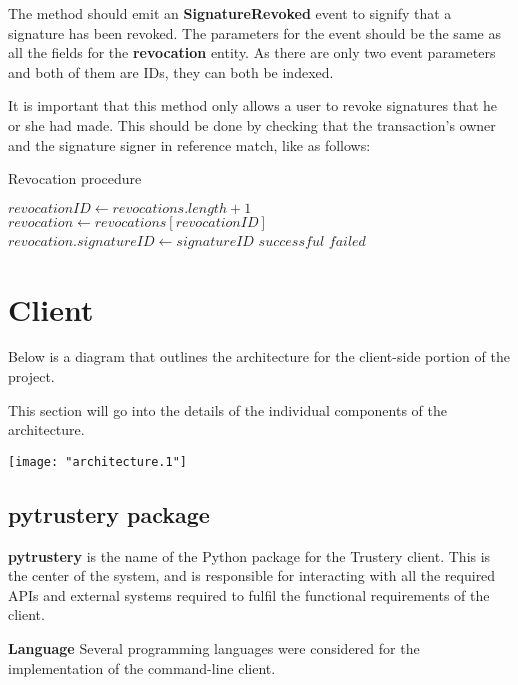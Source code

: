 \documentclass[12pt]{report}
\begin{document}
	The method should emit an \textbf{SignatureRevoked} event to signify that a signature has been revoked. The parameters for the event should be the same as all the fields for the \textbf{revocation} entity. As there are only two event parameters and both of them are IDs, they can both be indexed.
	
	It is important that this method only allows a user to revoke signatures that he or she had made. This should be done by checking that the transaction's owner and the signature signer in reference match, like as follows:
	
	\begin{algorithm}
		\caption{Revocation procedure}
		\label{revocationprocedure}
		\begin{algorithmic}[0]
					\State $revocationID \gets revocations.length + 1$
					\State $revocation \gets revocations[revocationID]$
					\State $revocation.signatureID \gets signatureID$
					\State {}
					\State \Return $successful$
				\Else
					\State \Return $failed$
				\EndIf
			\EndProcedure
		\end{algorithmic}
	\end{algorithm}
	
	\section{Client}
	Below is a diagram that outlines the architecture for the client-side portion of the project.
	
	This section will go into the details of the individual components of the architecture.
	
	\begin{center}
  		\texttt{[image: "architecture.1"]}
	\end{center}
	
	\subsection{pytrustery package}
	\textbf{pytrustery} is the name of the Python package for the Trustery client. This is the center of the system, and is responsible for interacting with all the required APIs and external systems required to fulfil the functional requirements of the client.
	
	\bigskip
	\noindent \textbf{Language}\newline
	Several programming languages were considered for the implementation of the command-line client.
	
\end{document}
